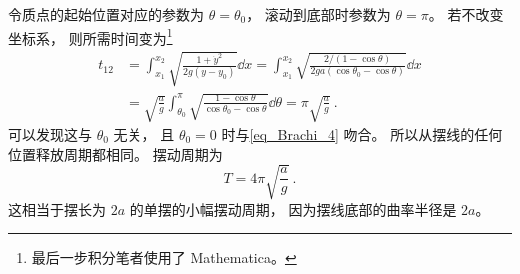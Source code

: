令质点的起始位置对应的参数为 $\theta = \theta_0$， 滚动到底部时参数为 $\theta = \pi$。
若不改变坐标系， 则所需时间变为\footnote{最后一步积分笔者使用了 Mathematica。}
\begin{equation}
\begin{aligned}
t_{12} &= \int_{x_1}^{x_2} \sqrt{\frac{1 + \dot{y}^2}{2g(y - y_0)}} \dd{x}
= \int_{x_1}^{x_2} \sqrt{\frac{2/(1 - \cos\theta)}{2ga(\cos\theta_0 - \cos\theta)}} \dd{x}\\
&= \sqrt{\frac{a}{g}}\int_{\theta_0}^{\pi} \sqrt{\frac{1 - \cos\theta}{\cos\theta_0 - \cos\theta}} \dd{\theta}
= \pi\sqrt{\frac{a}{g}}~.
\end{aligned}
\end{equation}
可以发现这与 $\theta_0$ 无关， 且 $\theta_0 = 0$ 时与\autoref{eq_Brachi_4} 吻合。 所以从摆线的任何位置释放周期都相同。 摆动周期为
\begin{equation}
T = 4\pi\sqrt{\frac{a}{g}}~.
\end{equation}
这相当于摆长为 $2a$ 的单摆的小幅摆动周期， 因为摆线底部的曲率半径是 $2a$。
